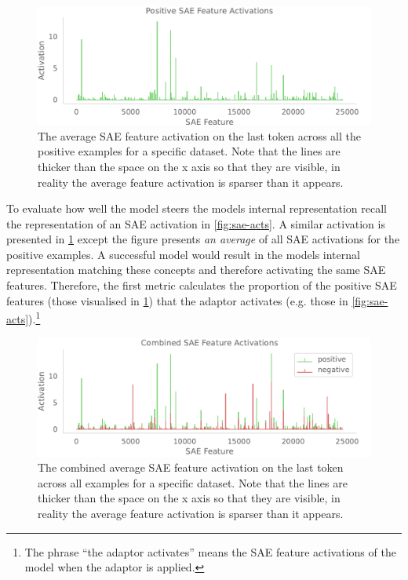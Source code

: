 \begin{figure}
    \centering
    \captionsetup{width=.9\textwidth}
    \includegraphics[width=\textwidth]{figures/positive_sae_acts.pdf}
    \caption{
        The average SAE feature activation on the last token across all the positive examples for a specific dataset.
        Note that the lines are thicker than the space on the x axis so that they are visible, in reality the average feature activation is sparser than it appears.
    }
    \label{fig:pos-sae}
\end{figure}

To evaluate how well the model steers the models internal representation recall the representation of an SAE activation in \cref{fig:sae-acts}.
A similar activation is presented in \cref{fig:pos-sae} except the figure presents \emph{an average} of all SAE activations for the positive examples.
A successful model would result in the models internal representation matching these concepts and therefore activating the same SAE features.
Therefore, the first metric calculates the proportion of the positive SAE features (those visualised in \cref{fig:pos-sae}) that the adaptor activates (e.g. those in \cref{fig:sae-acts}).\footnote{The phrase ``the adaptor activates'' means the SAE feature activations of the model when the adaptor is applied.}

\begin{figure}
    \centering
    \captionsetup{width=.9\textwidth}
    \includegraphics[width=\textwidth]{figures/combined_sae_acts.pdf}
    \caption{
        The combined average SAE feature activation on the last token across all examples for a specific dataset.
        Note that the lines are thicker than the space on the x axis so that they are visible, in reality the average feature activation is sparser than it appears.
    }
    \label{fig:comb-sae}
\end{figure}

